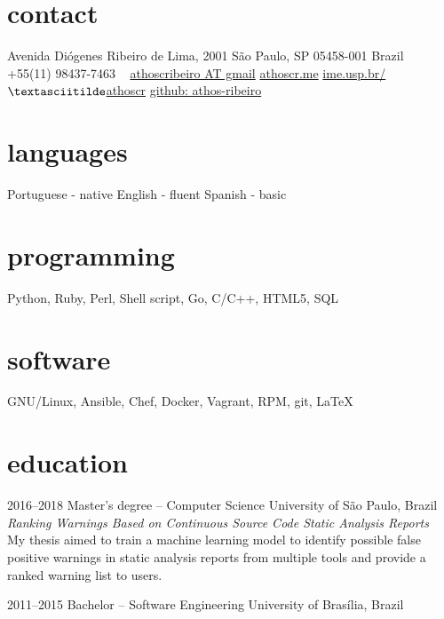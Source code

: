 \documentclass[print]{friggeri-cv}
\begin{document}


\begin{aside} %
\section{contact}
Avenida Diógenes Ribeiro de Lima, 2001
São Paulo, SP 05458-001
Brazil
~
+55(11) 98437-7463
~
\href{mailto:athoscribeiro@gmail.com}{athoscribeiro AT gmail}
\href{http://athoscr.me}{athoscr.me}
\href{https://www.ime.usp.br/~athoscr}{ime.usp.br/$\textasciitilde$athoscr}
\href{https://github.com/athos-ribeiro}{github: athos-ribeiro}
\section{languages}
Portuguese - native
English - fluent
Spanish - basic
\section{programming}
Python, Ruby, Perl, Shell script, Go, C/C++, HTML5, SQL
\section{software}
GNU/Linux, Ansible, Chef, Docker, Vagrant, RPM, git, \LaTeX
\end{aside}


\section{education}

\begin{entrylist}


\entry
{2016--2018}
{Master's degree -- {\normalfont Computer Science}}
{University of São Paulo, Brazil}
  {\emph{Ranking Warnings Based on Continuous Source Code Static Analysis Reports} \\ My thesis aimed to train a machine learning model to identify possible false positive warnings in static analysis reports from multiple tools and provide a ranked warning list to users.}


\entry
{2011--2015}
{Bachelor -- {\normalfont Software Engineering}}
{University of Brasília, Brazil}


\end{entrylist}
\end{document}
